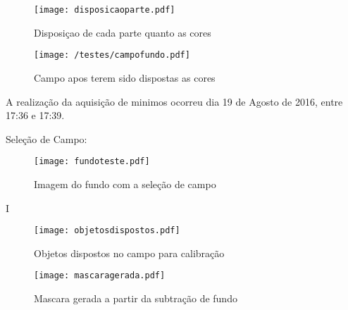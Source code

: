\begin{figure}[H]
\begin{minipage}[b]{0.45\linewidth}
\centering
\texttt{[image: disposicaoparte.pdf]}
\caption{Disposiçao de cada parte quanto as cores}
\label{fig:figure1}
\end{minipage}
\hspace{0.5cm}
\begin{minipage}[b]{0.45\linewidth}
\centering
\texttt{[image: /testes/campofundo.pdf]}
\caption{Campo apos terem sido dispostas as cores}
\label{fig:figure2}
\end{minipage}
\end{figure}

	
A realização da aquisição de minimos ocorreu dia 19 de Agosto de 2016, entre 17:36 e 17:39.

Seleção de Campo:
\begin{figure}[H]
		\centering
		\texttt{[image: fundoteste.pdf]}
		\caption{Imagem do fundo com a seleção de campo}
		\label{disposicaoparte}
	\end{figure}
	
I%
	
	\begin{figure}[H]
\begin{minipage}[H]{0.34\linewidth}
\centering
\texttt{[image: objetosdispostos.pdf]}
\caption{Objetos dispostos no campo para calibração}
\label{fig:figure1}
\end{minipage}
\hspace{0.5cm}
\begin{minipage}[H]{0.40\linewidth}
\centering
\texttt{[image: mascaragerada.pdf]}
\caption{Mascara gerada a partir da subtração de fundo}
\label{fig:figure2}
\end{minipage}
\end{figure}	
	
